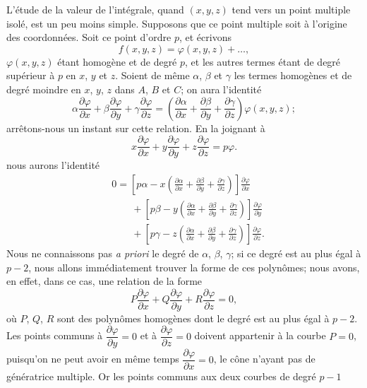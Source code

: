 \documentclass{article}
\begin{document}
L'étude de la valeur de l'intégrale, quand $(x, y, z)$ tend vers un point multiple isolé, est un peu moins simple. Supposons que ce point multiple soit à l'origine des coordonnées. Soit ce point d'ordre $p$, et écrivons
\[
f(x, y, z) = \varphi(x, y, z) + \ldots,
\]
$\varphi(x, y, z)$ étant homogène et de degré $p$, et les autres termes étant de degré supérieur à $p$ en $x$, $y$ et $z$. Soient de même $\alpha$, $\beta$ et $\gamma$ les termes homogènes et de degré moindre en $x$, $y$, $z$ dans $A$, $B$ et $C$; on aura l'identité
\[
\alpha \frac{\partial \varphi}{\partial x} + \beta \frac{\partial \varphi}{\partial y} + \gamma \frac{\partial \varphi}{\partial z} = \left( \frac{\partial \alpha}{\partial x} + \frac{\partial \beta}{\partial y} + \frac{\partial \gamma}{\partial z} \right) \varphi(x, y, z);
\]
arrêtons-nous un instant sur cette relation. En la joignant à
\[
x \frac{\partial \varphi}{\partial x} + y \frac{\partial \varphi}{\partial y} + z \frac{\partial \varphi}{\partial z} = p\varphi.
\]
nous aurons l'identité
\[
\begin{aligned}
&0 = \left[ p\alpha - x \left( \frac{\partial \alpha}{\partial x} + \frac{\partial \beta}{\partial y} + \frac{\partial \gamma}{\partial z} \right) \right] \frac{\partial \varphi}{\partial x} \\
&\qquad + \left[ p\beta - y \left( \frac{\partial \alpha}{\partial x} + \frac{\partial \beta}{\partial y} + \frac{\partial \gamma}{\partial z} \right) \right] \frac{\partial \varphi}{\partial y} \\
&\qquad + \left[ p\gamma - z \left( \frac{\partial \alpha}{\partial x} + \frac{\partial \beta}{\partial y} + \frac{\partial \gamma}{\partial z} \right) \right] \frac{\partial \varphi}{\partial z}.
\end{aligned}
\]
Nous ne connaissons pas \emph{a priori} le degré de $\alpha$, $\beta$, $\gamma$; si ce degré est au plus égal à $p - 2$, nous allons immédiatement trouver la forme de ces polynômes; nous avons, en effet, dans ce cas, une relation de la forme
\[
P \frac{\partial \varphi}{\partial x} + Q \frac{\partial \varphi}{\partial y} + R \frac{\partial \varphi}{\partial z} = 0, \tag{1}
\]
où $P$, $Q$, $R$ sont des polynômes homogènes dont le degré est au plus égal à $p - 2$. Les points communs à $\dfrac{\partial \varphi}{\partial y} = 0$ et à $\dfrac{\partial \varphi}{\partial z} = 0$ doivent appartenir à la courbe $P = 0$, puisqu'on ne peut avoir en même temps $\dfrac{\partial \varphi}{\partial x} = 0$, le cône n'ayant pas de génératrice multiple. Or les points communs aux deux courbes de degré $p - 1$
\end{document}
